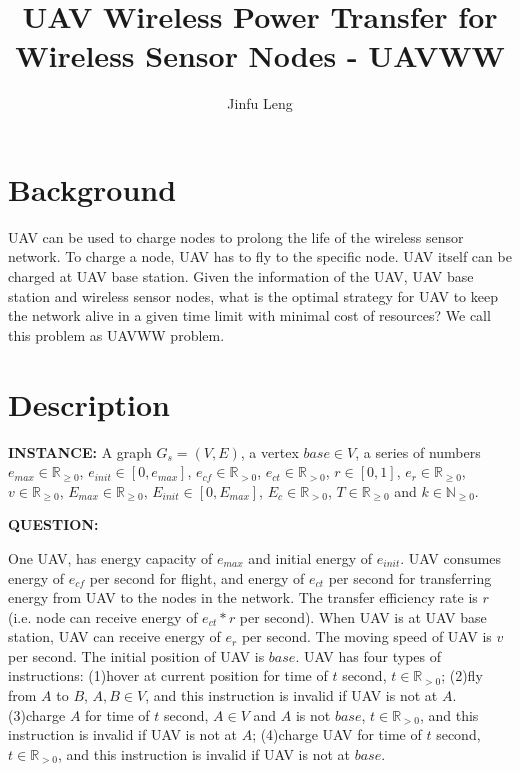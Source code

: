 \documentclass[11pt]{article}
\begin{document}
\title{UAV Wireless Power Transfer for Wireless Sensor Nodes - UAVWW}
\author{Jinfu Leng}
\maketitle
\section{Background}
UAV can be used to charge nodes to prolong the life of the wireless sensor network. To charge a node, UAV has to fly to the specific node. UAV itself can be charged at UAV base station. Given the information of the UAV, UAV base station and wireless sensor nodes, what is the optimal strategy for UAV to keep the network alive in a given time limit with minimal cost of resources? We call this problem as UAVWW problem.

\section{Description}
\noindent
\textbf{INSTANCE:} 
A graph $G_s = (V, E)$, a vertex $base \in V$, a series of numbers $e_{max} \in \mathbb{R}_{\geq0}$, $e_{init} \in [0, e_{max}]$, $e_{cf} \in \mathbb{R}_{>0}$, $e_{ct} \in \mathbb{R}_{>0}$, $r \in [0, 1]$, $e_r \in \mathbb{R}_{\geq0}$, $v \in \mathbb{R}_{\geq0}$, $E_{max} \in \mathbb{R}_{\geq0}$, $E_{init} \in [0, E_{max}]$, $E_{c} \in \mathbb{R}_{>0}$, $T \in \mathbb{R}_{\geq0}$ and $k \in \mathbb{N}_{\geq0}$.

\noindent
\textbf{QUESTION:}

One UAV, has energy capacity of $e_{max}$ and initial energy of $e_{init}$. UAV consumes energy of $e_{cf}$ per second for flight, and energy of $e_{ct}$ per second for transferring energy from UAV to the nodes in the network. The transfer efficiency rate is $r$ (i.e. node can receive energy of $e_{ct}*r$ per second). When UAV is at UAV base station, UAV can receive energy of $e_r$ per second. The moving speed of UAV is $v$ per second. The initial position of UAV is $base$. UAV has four types of instructions: (1)hover at current position for time of $t$ second, $t \in \mathbb{R}_{>0}$; (2)fly from $A$ to $B$, $A,B \in V$, and this instruction is invalid if UAV is not at $A$. (3)charge $A$ for time of $t$ second, $A \in V$ and $A$ is not $base$, $t \in \mathbb{R}_{>0}$, and this instruction is invalid if UAV is not at $A$; (4)charge UAV for time of $t$ second, $t \in \mathbb{R}_{>0}$, and this instruction is invalid if UAV is not at $base$.
\end{document}
